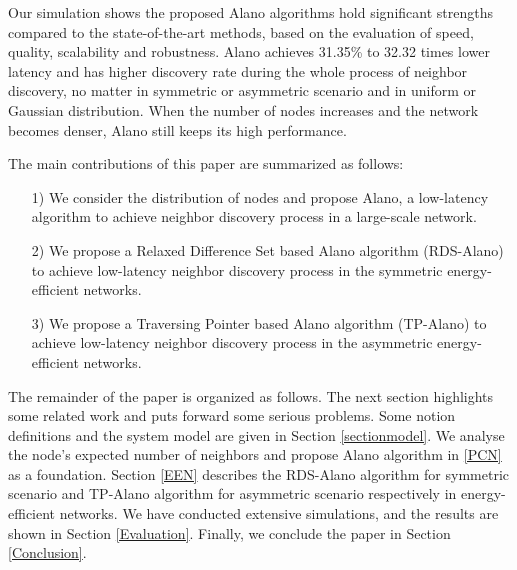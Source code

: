 Our simulation shows the proposed Alano algorithms
hold significant strengths compared to the state-of-the-art methods,
based on the evaluation of speed, quality, scalability and robustness. 
Alano achieves 31.35\% to 32.32 times lower latency
and has higher discovery rate during the whole process of neighbor discovery, 
no matter in symmetric or asymmetric scenario and in uniform or Gaussian distribution.
When the number of nodes increases and the network becomes denser, 
Alano still keeps its high performance. 


The main contributions of this paper are summarized as follows:
\begin{itemize}
\item[1)] We consider the distribution of nodes and propose Alano, 
a low-latency algorithm to achieve neighbor discovery process in a large-scale network.
\item[2)] We propose a Relaxed Difference Set based Alano algorithm (RDS-Alano) 
to achieve low-latency neighbor discovery process in the symmetric energy-efficient networks. 
\item[3)] We propose a Traversing Pointer based Alano algorithm (TP-Alano) to
achieve low-latency neighbor discovery process in the asymmetric energy-efficient networks. 
\end{itemize}


The remainder of the paper is organized as follows.
The next section highlights some related work and 
puts forward some serious problems. 
Some notion definitions and the system model are given in Section \ref{sectionmodel}. 
We analyse the node's expected number of neighbors and 
propose Alano algorithm in \ref{PCN} as a foundation.
Section \ref{EEN} describes the RDS-Alano algorithm for 
symmetric scenario and TP-Alano algorithm for asymmetric scenario
respectively in energy-efficient networks.
We have conducted extensive simulations, and the results are shown in Section
\ref{Evaluation}. Finally, we conclude the paper in Section
\ref{Conclusion}.

